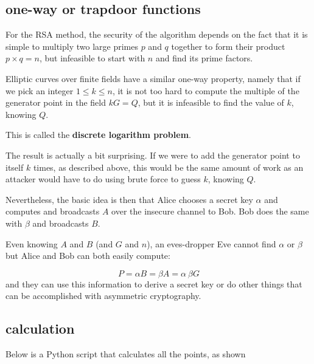 \documentclass[11pt, oneside]{article}
\begin{document}
\subsection*{one-way or trapdoor functions}
For the RSA method, the security of the algorithm depends on the fact that it is simple to multiply two large primes $p$ and $q$ together to form their product $p \times q = n$, but infeasible to start with $n$ and find its prime factors.

Elliptic curves over finite fields have a similar one-way property, namely that if we pick an integer $1 \le k \le n$, it is not too hard to compute the multiple of the generator point in the field $kG = Q$, but it is infeasible to find the value of $k$, knowing $Q$.

This is called the \textbf{discrete logarithm problem}.

The result is actually a bit surprising.  If we were to add the generator point to itself $k$ times, as described above, this would be the same amount of work as an attacker would have to do using brute force to guess $k$, knowing $Q$.

Nevertheless, the basic idea is then that Alice chooses a secret key $\alpha$ and computes and broadcasts $A$ over the insecure channel to Bob.  Bob does the same with $\beta$ and broadcasts $B$.

Even knowing $A$ and $B$ (and $G$ and $n$), an eves-dropper Eve cannot find $\alpha$ or $\beta$ but Alice and Bob can both easily compute:

\[ P = \alpha B = \beta A = \alpha \ \beta G \]
and they can use this information to derive a secret key or do other things that can be accomplished with asymmetric cryptography.

\subsection*{calculation}

Below is a Python script that calculates all the points, as shown
\end{document}
